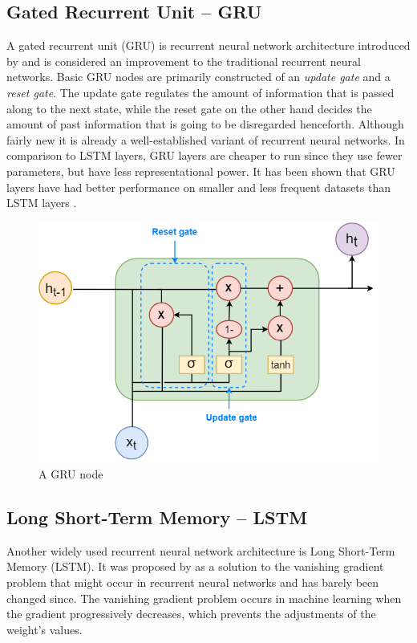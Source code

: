 \documentclass[nofilelist]{cslthse-msc}
\begin{document}
\subsection{Gated Recurrent Unit -- GRU}
A gated recurrent unit (GRU) is recurrent neural network architecture introduced by \citet{cho2014learning} and is considered an improvement to the traditional recurrent neural networks. Basic GRU nodes  are primarily constructed of an \textit{update gate} and a \textit{reset gate}. The update gate regulates the amount of information that is passed along to the next state, while the reset gate on the other hand decides the amount of past information that is going to be disregarded henceforth. 
Although fairly new it is already a well-established variant of recurrent neural networks. In comparison to LSTM layers, GRU layers are cheaper to run since they use fewer parameters, but have less representational power. It has been shown that GRU layers have had better performance on smaller and less frequent datasets than LSTM layers \citep{Gruber2020AreGC}.


\begin{figure}[!ht]
    \centering
    \includegraphics[scale=0.5]{msccls/explanatory_images/gru.png}
    \caption{A GRU node}
    \label{fig:gru_node}
\end{figure}

\subsection{Long Short-Term Memory -- LSTM}
Another widely used recurrent neural network architecture is Long Short-Term Memory (LSTM). It was proposed by \citet{hochreiter1997} as a solution to the vanishing gradient problem that might occur in recurrent neural networks and has barely been changed since. The vanishing gradient problem occurs in machine learning when the gradient progressively decreases, which prevents the adjustments of the weight's values. 
\end{document}

